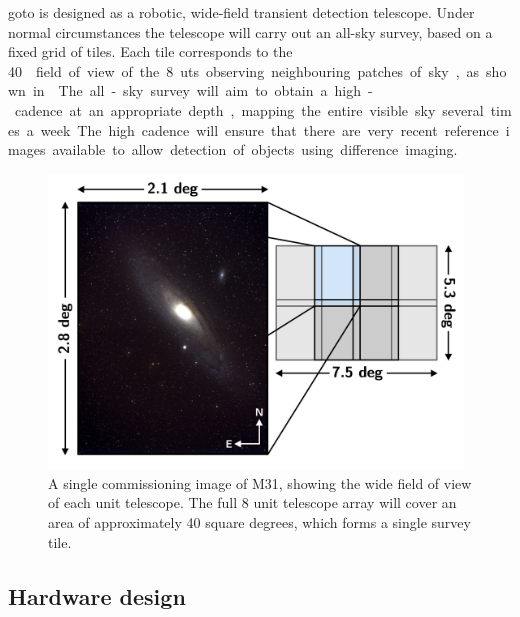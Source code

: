\begin{colsection}
\begin{colsection}
\gls{goto} is designed as a robotic, wide-field transient detection telescope. Under normal circumstances the telescope will carry out an all-sky survey, based on a fixed grid of tiles. Each tile corresponds to the \SI{40}{\square\deg} field of view of the 8 \glspl{ut} observing neighbouring patches of sky, as shown in . The all-sky survey will aim to obtain a high-cadence at an appropriate depth, mapping the entire visible sky several times a week. The high cadence will ensure that there are very recent reference images available to allow detection of objects using difference imaging.

\begin{figure}[t]
    \begin{center}
        \includegraphics[width=11cm]{images/tiles.pdf}
    \end{center}
    \caption[M31]{
        A single commissioning image of M31, showing the wide field of view of each unit telescope. The full 8 unit telescope array will cover an area of approximately 40 square degrees, which forms a single survey tile.
    }\label{fig:tiles}
\end{figure}

\end{colsection}


\subsection{Hardware design}
\label{sec:goto_design}
\begin{colsection}


\end{colsection}


\end{colsection}
